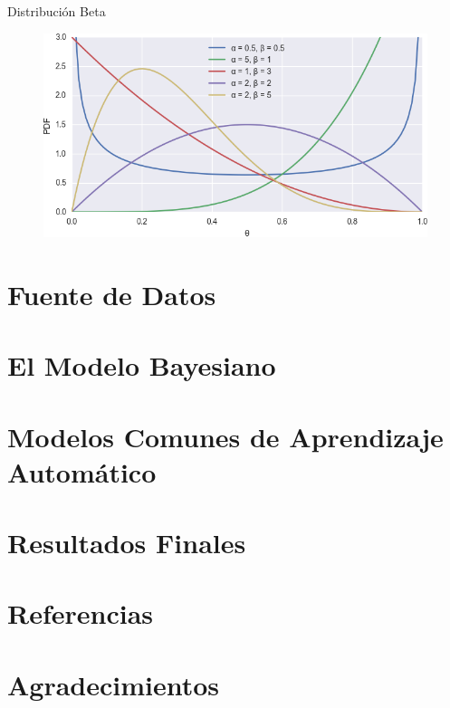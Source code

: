 \documentclass{beamer}
\begin{document}
\begin{frame}{Distribución Beta}
	
	\begin{figure}
		\includegraphics[width=\framewidth]{beta.png}
	\end{figure}
	
\end{frame}

\section{Fuente de Datos}

\begin{frame}
	
\end{frame}

\section{El Modelo Bayesiano}

\begin{frame}
	
\end{frame}

\section{Modelos Comunes de Aprendizaje Automático}

\begin{frame}
	
\end{frame}

\section{Resultados Finales}

\begin{frame}
	
\end{frame}

\section{Referencias}

\section{Agradecimientos}

\begin{frame}
	
\end{frame}
\end{document}
